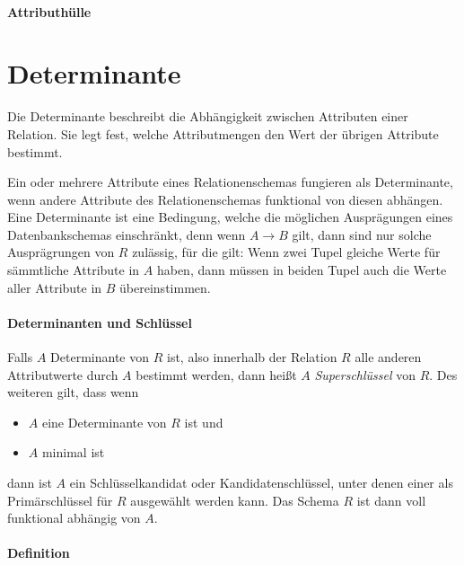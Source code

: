 \documentclass{scrbook}
\begin{document}
\paragraph{Attributhülle}


\section{Determinante}

Die Determinante beschreibt die Abhängigkeit zwischen Attributen einer Relation.
Sie legt fest, welche Attributmengen den Wert der übrigen Attribute bestimmt.

\begin{definition}[Determinante]
Ein oder mehrere Attribute eines Relationenschemas fungieren als Determinante,
wenn andere Attribute des Relationenschemas funktional von diesen abhängen.
Eine Determinante ist eine Bedingung, welche die möglichen Ausprägungen eines 
Datenbankschemas einschränkt, denn wenn $A → B$ gilt, dann sind nur solche Ausprägrungen
von $R$ zulässig, für die gilt:
Wenn zwei Tupel gleiche Werte für sämmtliche Attribute in $A$ haben, dann müssen in beiden Tupel
auch die Werte aller Attribute in $B$ übereinstimmen.
\end{definition}

\paragraph{Determinanten und Schlüssel}

Falls $A$ Determinante von $R$ ist, also innerhalb der Relation $R$ alle anderen Attributwerte
durch $A$ bestimmt werden, dann heißt $A$ \emph{Superschlüssel} von $R$.
Des weiteren gilt, dass wenn 
\begin{itemize}
\item $A$ eine Determinante von $R$ ist und 
\item $A$ minimal ist
\end{itemize}
dann ist $A$ ein Schlüsselkandidat oder Kandidatenschlüssel, unter denen einer als 
Primärschlüssel für $R$ ausgewählt werden kann.
Das Schema $R$ ist dann voll funktional abhängig von $A$.


\paragraph{Definition}
\end{document}
